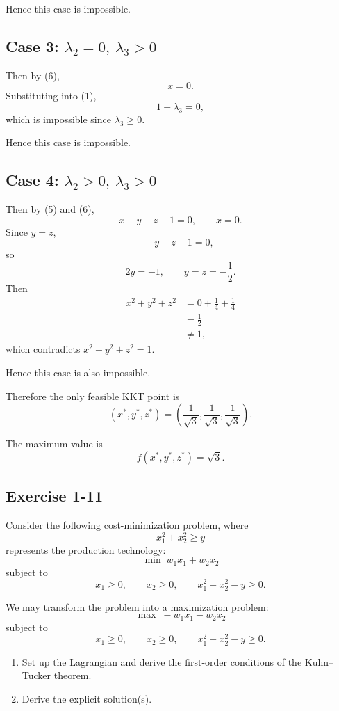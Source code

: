Hence this case is impossible.

\subsection*{Case 3: \(\lambda_2=0,\ \lambda_3>0\)}

Then by (6),
\[
x=0.
\]
Substituting into (1),
\[
1+\lambda_3=0,
\]
which is impossible since \(\lambda_3\ge 0\).

Hence this case is impossible.

\subsection*{Case 4: \(\lambda_2>0,\ \lambda_3>0\)}

Then by (5) and (6),
\[
x-y-z-1=0,
\qquad
x=0.
\]
Since \(y=z\),
\[
-y-z-1=0,
\]
so
\[
2y=-1,
\qquad
y=z=-\frac12.
\]
Then
\[
\begin{aligned}
x^2+y^2+z^2
&=
0+\frac14+\frac14\\
&=
\frac12 \\
&\neq 1,
\end{aligned}
\]
which contradicts \(x^2+y^2+z^2=1\).

Hence this case is also impossible.

Therefore the only feasible KKT point is
\[
\boxed{
\left(x^*,y^*,z^*\right)
=
\left(\frac1{\sqrt3},\frac1{\sqrt3},\frac1{\sqrt3}\right).
}
\]

The maximum value is
\[
\boxed{
f(x^*,y^*,z^*)=\sqrt3.
}
\]



\vspace{30pt}
\begin{tcolorbox}[breakable]

\subsection*{Exercise 1-11}

Consider the following cost-minimization problem, where
\[
x_1^2 + x_2^2 \ge y
\]
represents the production technology:
\[
\min \; w_1 x_1 + w_2 x_2
\]
subject to
\[
x_1 \ge 0,\qquad x_2 \ge 0,\qquad x_1^2 + x_2^2 - y \ge 0.
\]

We may transform the problem into a maximization problem:
\[
\max \; -w_1 x_1 - w_2 x_2
\]
subject to
\[
x_1 \ge 0,\qquad x_2 \ge 0,\qquad x_1^2 + x_2^2 - y \ge 0.
\]

\begin{enumerate}
    \item[(i)] Set up the Lagrangian and derive the first-order conditions
    of the Kuhn--Tucker theorem.
    \item[(ii)] Derive the explicit solution(s).
\end{enumerate}

\end{tcolorbox}



